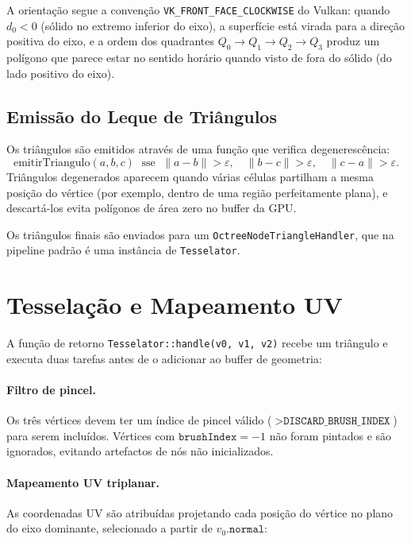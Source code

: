\documentclass[10pt,a4paper]{article}
\begin{document}
A orientação segue a convenção \texttt{VK\_FRONT\_FACE\_CLOCKWISE}
do Vulkan: quando $d_0 < 0$ (sólido no extremo inferior do eixo), a
superfície está virada para a direção positiva do eixo, e a ordem
dos quadrantes $Q_0\!\to\!Q_1\!\to\!Q_2\!\to\!Q_3$ produz um polígono
que parece estar no sentido horário quando visto de fora do sólido
(do lado positivo do eixo).

\subsection{Emissão do Leque de Triângulos}

Os triângulos são emitidos através de uma função que verifica
degenerescência:
\[
  \text{emitirTriangulo}(a, b, c) \;\text{ sse }\;
    \|a-b\| > \varepsilon, \quad \|b-c\| > \varepsilon, \quad \|c-a\| > \varepsilon.
\]
Triângulos degenerados aparecem quando várias células partilham a
mesma posição do vértice (por exemplo, dentro de uma região
perfeitamente plana), e descartá-los evita polígonos de área zero no
buffer da GPU.

Os triângulos finais são enviados para um
\lstinline{OctreeNodeTriangleHandler}, que na pipeline padrão é uma
instância de \lstinline{Tesselator}.

\section{Tesselação e Mapeamento UV}
\label{sec:tesselator}

A função de retorno \lstinline{Tesselator::handle(v0, v1, v2)}
recebe um triângulo e executa duas tarefas antes de o adicionar ao
buffer de geometria:

\paragraph{Filtro de pincel.}
Os três vértices devem ter um índice de pincel válido
($> \texttt{DISCARD\_BRUSH\_INDEX}$) para serem incluídos. Vértices
com $\texttt{brushIndex} = -1$ não foram pintados e são ignorados,
evitando artefactos de nós não inicializados.

\paragraph{Mapeamento UV triplanar.}
As coordenadas UV são atribuídas projetando cada posição do vértice
no plano do eixo dominante, selecionado a partir de
$v_0.\texttt{normal}$:
\end{document}

